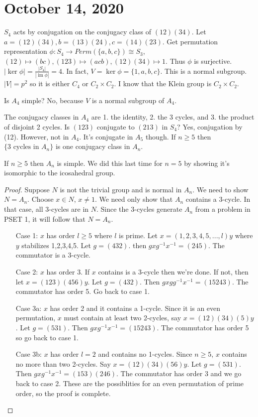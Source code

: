 \documentclass{article}
\newcommand{\ra}[1][]{\xrightarrow{#1}}
\DeclareMathOperator{\im}{im}
\begin{document}
\section{October 14, 2020}
$S_4$ acts by conjugation on the conjugacy class of $(12)(34)$. Let $a=(12)(34), b=(13)(24), c=(14)(23)$. Get permutation representation $\phi: S_4\ra Perm(\{a,b,c\})\cong S_3$, $(12)\mapsto (bc), (123)\mapsto (acb), (12)(34)\mapsto 1$.  Thus $\phi$ is surjective. $|\ker\phi|=\frac{|S_4|}{|\im\phi|}=4$. In fact, $V=\ker\phi=\{1,a,b,c\}$. This is a normal subgroup. $|V|=p^2$ so it is either $C_4$ or $C_2\times C_2$. I know that the Klein group is $C_2\times C_2$.
\begin{example}
Is $A_4$ simple? No, because $V$ is a normal subgroup of $A_4$. 
\end{example}
The conjugacy classes in $A_4$ are 1. the identity, 2. the 3 cycles, and 3. the product of disjoint 2 cycles. Is $(123)$ conjugate to $(213)$ in $S_4$? Yes, conjugation by (12). However, not in $A_4$. It's conjugate in $A_5$ though. If $n\geq 5$ then $\{\textrm{3 cycles in }A_n\}$ is one conjugacy class in $A_n$. 
\begin{theorem}
If $n\geq 5$ then $A_n$ is simple. We did this last time for $n=5$ by showing it's isomorphic to the icosahedral group.
\end{theorem}
\begin{proof}
Suppose $N$ is not the trivial group and is normal in $A_n$. We need to show $N=A_n$. Choose $x\in N$, $x\neq 1$. We need only show that $A_n$ contains a 3-cycle. In that case, all 3-cycles are in $N$. Since the 3-cycles generate $A_n$ from a problem in PSET 1, it will follow that $N=A_n$. 
\begin{enumerate}
    \item[Case 1:] $x$ has order $l\geq 5$ where $l$ is prime. Let $x=(1,2,3,4,5,...,l)y$ where $y$ stabilizes 1,2,3,4,5. Let $g=(432).$ then $gxg^{-1}x^{-1}=(245)$. The commutator is a 3-cycle.
    \item[Case 2:] $x$ has order 3. If $x$ contains is a 3-cycle then we're done. If not, then let $x=(123)(456)y$. Let $g=(432)$. Then $gxgg^{-1}x^{-1}=(15243)$. The commutator has order 5. Go back to case 1.
    \item[Case 3a:] $x$ has order 2 and it contains a 1-cycle. Since it is an even permutation, $x$ must contain at least two 2-cycles, say $x=(12)(34)(5)y$. Let $g=(531)$. Then $gxg^{-1}x^{-1}=(15243)$. The commutator has order 5 so go back to case 1.
    \item[Case 3b:] $x$ has order $l=2$ and contains no 1-cycles. Since $n\geq 5$, $x$ contains no more than two 2-cycles. Say $x=(12)(34)(56)y$. Let $g=(531).$ Then $gxg^{-1}x^{-1}=(153)(246)$. The commutator has order 3 and we go back to case 2. These are the possiblities for an even permutation of prime order, so the proof is complete.
\end{enumerate}
\end{proof}
\end{document}

